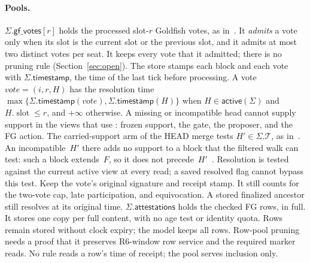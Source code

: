 \documentclass{article}
\theoremstyle{plain}
\theoremstyle{definition}
\theoremstyle{remark}
\newcommand{\slot}{\operatorname{slot}}
\newcommand{\act}{\mathsf{active}}
\newcommand{\T}{\mathcal T}
\newcommand{\gfPool}{\mathsf{gf\_votes}}
\newcommand{\attestations}{\mathsf{attestations}}
\newcommand{\fname}[1]{\text{\textsc{#1}}}
\newcommand{\timestamp}{\mathsf{timestamp}}
\newcommand{\DC}[1]{\cite[\S#1]{DC}}
\newcommand{\SAS}{\cite{SAS}}
\begin{document}
\paragraph{Pools.}  $\Sigma.\gfPool[r]$ holds the processed slot-$r$
Goldfish votes, as in~\SAS.  It \emph{admits} a vote only when its slot
is the current slot or the previous slot, and it admits at most two
distinct votes per seat.  It keeps every vote that it admitted; there is
no pruning rule (Section~\ref{sec:open}).  The store stamps each block
and each vote with $\Sigma.\timestamp$, the time of the last tick
before processing.  A vote $\mathit{vote}=(i,r,H)$ has the resolution
time $\max\{\Sigma.\timestamp(\mathit{vote}),\Sigma.\timestamp(H)\}$
when $H\in\act(\Sigma)$ and $H.\slot\leq r$, and $+\infty$ otherwise.
A missing or incompatible head cannot supply support in the views that
use \fname{resolution\_time}: frozen support, the gate, the proposer, and
the FG action.  The carried-support arm of the HEAD merge tests
$H'\in\Sigma.\T$, as in~\DC{7}.  An incompatible~$H'$ there adds no
support to a block that the filtered walk can test: such a block
extends~$F$, so it does not precede~$H'$~\cite[L1]{FR}.  Resolution is
tested against the current active view at every read; a saved resolved flag cannot bypass this
test.  Keep the vote's original signature and receipt stamp.  It still
counts for the two-vote cap, late participation, and equivocation.  A
stored finalized ancestor still resolves at its original time.
$\Sigma.\attestations$ holds the checked FG rows, in full.
It stores one copy per full content, with no age test or identity quota.
Rows remain stored without clock expiry; the model keeps all rows.
Row-pool pruning needs a proof that it preserves R6-window row service
and the required marker reads.
No rule reads a row's time of receipt; the pool serves inclusion only.
\end{document}
